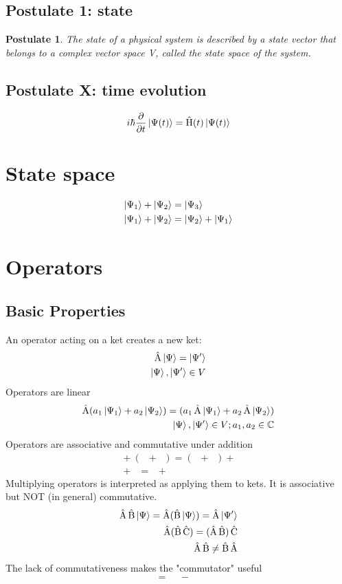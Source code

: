 \documentclass[10pt,a4paper]{book}
\newtheorem{post}{Postulate}
\DeclareMathOperator {\opH} {\hat{H}}
\DeclareMathOperator {\opA} {\hat{A}}
\DeclareMathOperator {\opB} {\hat{B}}
\DeclareMathOperator {\opC} {\hat{C}}
\begin{document}
\section{Postulate 1: state}

\begin{post}
	The state of a physical system is described by a state vector that belongs to a complex vector space V, called the state space of the system.
\end{post}


\section{Postulate X: time evolution}
\begin{align}
	i\hbar \frac{ \partial } { \partial t } \ket{ \Psi(t) } = \opH(t)\ket{ \Psi(t) }
\end{align}


\chapter{State space}
\begin{align}
	\ket{ \Psi_1} + \ket{ \Psi_2} & = \ket{ \Psi_3}                 \\
	\ket{ \Psi_1} + \ket{ \Psi_2} & = \ket{ \Psi_2} + \ket{ \Psi_1}
\end{align}
\chapter{Operators}
\section{Basic Properties}
An operator acting on a ket creates a new ket:
\begin{align}
	\opA \ket{\Psi} = \ket{\Psi'} \\
	\ket{\Psi}, \ket{\Psi'} \in V
\end{align}
Operators are linear
\begin{align}
	\opA (a_1\ket{\Psi_1} + a_2\ket{\Psi_2}) = (a_1\opA\ket{\Psi_1} + a_2\opA\ket{\Psi_2}) \\
	\ket{\Psi}, \ket{\Psi'} \in V; a_1, a_2 \in \mathbb{C}
\end{align}
Operators are associative and commutative under addition
\begin{align}
	\opA + (\opB + \opC) = (\opA + \opB) + \opC \\
	\opA + \opB = \opB + \opA
\end{align}
Multiplying operators is interpreted as applying them to kets. It is associative but NOT (in general) commutative.
\begin{align}
	\opA\opB\ket{\Psi} = \opA(\opB\ket{\Psi}) = \opA\ket{\Psi'} \\
	\opA(\opB\opC) = (\opA\opB)\opC                             \\
	\opA\opB \ne \opB\opA
\end{align}
The lack of commutativeness makes the "commutator" useful
\begin{align}
	[\opA, \opB] = \opA\opB - \opB\opA \\
\end{align}
\end{document}
